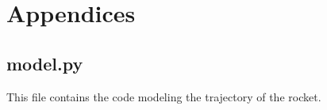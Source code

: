 \documentclass{article}
\begin{document}
\section{Appendices}
\subsection{model.py}
This file contains the code modeling the trajectory of the rocket.





\end{document}
